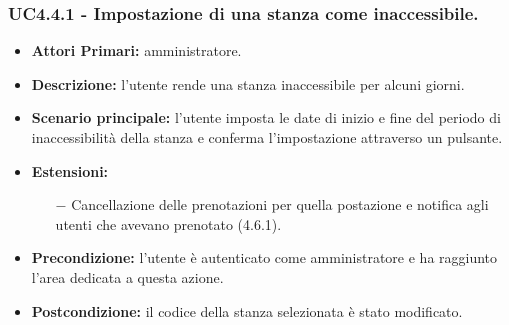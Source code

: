 \subsubsection{UC4.4.1 - Impostazione di una stanza come inaccessibile.}
\begin{itemize}
	\item\textbf{Attori Primari:}
	amministratore.
	\item\textbf{Descrizione:}
	l'utente rende una stanza inaccessibile per alcuni giorni.
	\item\textbf{Scenario principale:} 
	l'utente imposta le date di inizio e fine del periodo di inaccessibilità della stanza e conferma l'impostazione attraverso un pulsante.
	\item\textbf{Estensioni:}
	\begin{itemize}
		\item[$-$] Cancellazione delle prenotazioni per quella postazione e notifica agli utenti che avevano prenotato (4.6.1).
	\end{itemize}
	\item\textbf{Precondizione:} 
	l'utente è autenticato come amministratore e ha raggiunto l'area dedicata a questa azione.
	\item\textbf{Postcondizione:}
	il codice della stanza selezionata è stato modificato.
\end{itemize}

